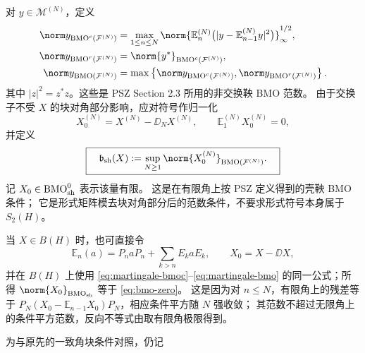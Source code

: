 对 $y\in\mathcal M^{(N)}$，定义
\begin{align}
 \norm y_{\mathrm{BMO}^{c}(\mathcal F^{(N)})}
 &=\max_{1\leq n\leq N}
 \norm{\mathbb E_n^{(N)}
   \bigl(|y-\mathbb E_{n-1}^{(N)}y|^2\bigr)}_\infty^{1/2},\label{eq:martingale-bmoc}\\
 \norm y_{\mathrm{BMO}^{r}(\mathcal F^{(N)})}
 &=\norm{y^*}_{\mathrm{BMO}^{c}(\mathcal F^{(N)})},\label{eq:martingale-bmor}\\
 \norm y_{\mathrm{BMO}(\mathcal F^{(N)})}
 &=\max\left\{
 \norm y_{\mathrm{BMO}^{c}(\mathcal F^{(N)})},
 \norm y_{\mathrm{BMO}^{r}(\mathcal F^{(N)})}\right\}.\label{eq:martingale-bmo}
\end{align}
其中 $|z|^2=z^*z$。这些是 PSZ Section 2.3 所用的非交换鞅 BMO 范数。
由于交换子不受 $X$ 的块对角部分影响，应对符号作归一化
\[
 X_0^{(N)}=X^{(N)}-\DD_NX^{(N)},\qquad
 \mathbb E_1^{(N)}X_0^{(N)}=0,
\]
并定义
\begin{equation}\label{eq:bmo-zero}
 \boxed{\quad
 \mathfrak b_{\rm sh}(X)
 :=\sup_{N\geq1}\norm{X_0^{(N)}}_{\mathrm{BMO}(\mathcal F^{(N)})}.
 \quad}
\end{equation}
记 $X_0\in\mathrm{BMO}_{\rm sh}^{0}$ 表示该量有限。
这是在有限角上按 PSZ 定义得到的壳鞅 BMO 条件；
它是形式矩阵模去块对角部分后的范数条件，不要求形式符号本身属于 $S_2(H)$。

当 $X\in B(H)$ 时，也可直接令
\[
 \mathbb E_n(a)=P_naP_n+\sum_{k>n}E_kaE_k,\qquad
 X_0=X-\DD X,
\]
并在 $B(H)$ 上使用 \eqref{eq:martingale-bmoc}--\eqref{eq:martingale-bmo}
的同一公式；所得 $\norm{X_0}_{\mathrm{BMO}_{\rm sh}}$
等于 \eqref{eq:bmo-zero}。
这是因为对 $n\leq N$，有限角上的残差等于
$P_N(X_0-\mathbb E_{n-1}X_0)P_N$，相应条件平方随 $N$ 强收敛；
其范数不超过无限角上的条件平方范数，反向不等式由取有限角极限得到。

\medskip
为与原先的一致角块条件对照，仍记
